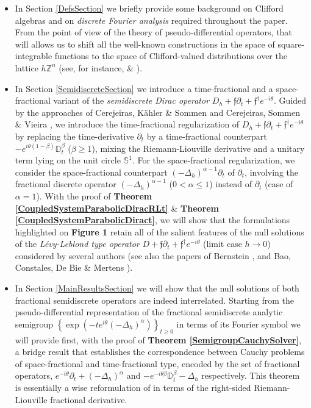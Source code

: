 \documentclass{elsarticle}
\newcommand{\BZ}{{\mathbb Z}}
\newcommand{\f}{{\mathfrak f}}
\begin{document}
\begin{itemize}
	\item In Section \ref{DefsSection} we briefly provide some background on Clifford algebras and on {\it discrete Fourier analysis} required throughout the paper. From the point of view of the theory of pseudo-differential operators, that will allows us to shift all the well-known constructions in the space of square-integrable functions to the space of Clifford-valued distributions over the lattice $h\BZ^n$ (see, for instance, \cite[Subsection 21.2]{F19} \& \cite[Subsection 2.2.]{F19}).
	\item In Section \ref{SemidiscreteSection} we introduce a time-fractional and a space-fractional variant of the {\it semidiscrete Dirac operator} $D_h+\f\partial_t+\f^\dagger e^{-i\theta}$. 
	Guided by the approaches of Cerejeiras, K\"ahler \& Sommen \cite{CKS05} and Cerejeiras, Sommen \& Vieira \cite{CSV07}, we introduce the time-fractional regularization of $D_h+\f\partial_t+\f^\dagger e^{-i\theta}$ by replacing the time-derivative $\partial_t$ by a time-fractional counterpart $-e^{i\theta(1-\beta)}\mathbb{D}_t^\beta$ ($\beta\geq 1$), mixing the Riemann-Liouville derivative and a unitary term lying on the unit circle $\mathbb{S}^1$. For the space-fractional regularization, we consider the space-fractional counterpart $(-\Delta_h)^{\alpha-1}\partial_t$ of $\partial_t$, involving the fractional discrete operator $(-\Delta_h)^{\alpha-1}$ ($0<\alpha\leq 1$) instead of $\partial_t$ (case of $\alpha=1$). With the proof of {\bf Theorem \ref{CoupledSystemParabolicDiracRLt}} \& {\bf Theorem \ref{CoupledSystemParabolicDiract}}, we will show that the formulations highlighted on {\bf Figure 1} retain all of the salient features of the null solutions of the {\it L\'evy-Leblond type operator} $D+\f \partial_t+\f^\dagger e^{-i\theta}$ (limit case $h\rightarrow 0$) considered by several authors (see also the papers of Bernstein \cite{B06}, and Bao, Constales, De Bie \& Mertens \cite{BCBM20}).
	\item In Section \ref{MainResultsSection} we will show that the null solutions of both fractional semidiscrete operators are indeed interrelated.
	Starting from the pseudo-differential representation of the fractional semidiscrete analytic semigroup \newline $\displaystyle \left\{\exp(-te^{i\theta}(-\Delta_h)^\alpha)\right\}_{t\geq 0}$ in terms of its Fourier symbol we will provide first, with the proof of {\bf Theorem \ref{SemigroupCauchySolver}}, a bridge result that establishes the correspondence between Cauchy problems of space-fractional and time-fractional type, encoded by the set of fractional operators, $e^{-i\theta}\partial_t+(-\Delta_h)^\alpha$ and $-e^{-i\theta \beta}\mathbb{D}_t^\beta-\Delta_h$ respectively. This theorem is essentially a wise reformulation of \cite[Theorem 3]{CLRV15} in terms of the right-sided Riemann-Liouville fractional derivative.

\end{itemize}
\end{document}

